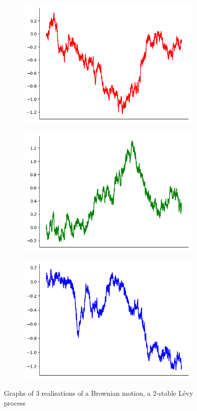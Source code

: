 \begin{figure}[htbp]
	\centering
	\begin{subfigure}{0.3\textwidth}
		\centering
		\includegraphics[width=0.85\linewidth]{pics/ch-brownian/2-brownianr.png}
	\end{subfigure}%
	\begin{subfigure}{.3\textwidth}
		\centering
		\includegraphics[width=.9\linewidth]{pics/ch-brownian/2-browniang.png}
	\end{subfigure}%
	\begin{subfigure}{.3\textwidth}
		\centering
		\includegraphics[width=.9\linewidth]{pics/ch-brownian/2-brownianb.png}
	\end{subfigure}
	\caption{Graphs of 3 realisations of a Brownian motion, a 2-stable L\'evy process}
	\label{fig:brownian}
\end{figure}




